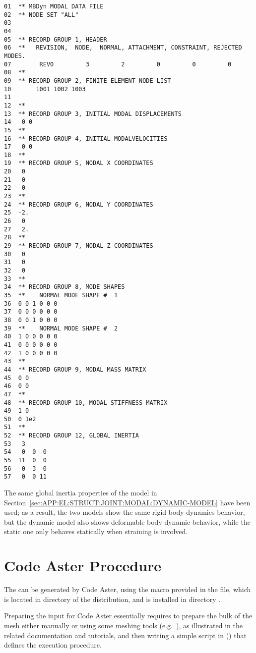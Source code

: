 \noindent
{\small
\begin{verbatim}
01  ** MBDyn MODAL DATA FILE
02  ** NODE SET "ALL" 
03    
04    
05  ** RECORD GROUP 1, HEADER
06  **   REVISION,  NODE,  NORMAL, ATTACHMENT, CONSTRAINT, REJECTED MODES.
07        REV0         3         2         0         0         0
08  **
09  ** RECORD GROUP 2, FINITE ELEMENT NODE LIST
10       1001 1002 1003
11  
12  **
13  ** RECORD GROUP 3, INITIAL MODAL DISPLACEMENTS
14   0 0
15  **
16  ** RECORD GROUP 4, INITIAL MODALVELOCITIES
17   0 0
18  **
19  ** RECORD GROUP 5, NODAL X COORDINATES
20   0
21   0
22   0
23  **
24  ** RECORD GROUP 6, NODAL Y COORDINATES
25  -2.
26   0
27   2.
28  **
29  ** RECORD GROUP 7, NODAL Z COORDINATES
30   0
31   0
32   0
33  **
34  ** RECORD GROUP 8, MODE SHAPES
35  **    NORMAL MODE SHAPE #  1
36  0 0 1 0 0 0
37  0 0 0 0 0 0
38  0 0 1 0 0 0
39  **    NORMAL MODE SHAPE #  2
40  1 0 0 0 0 0
41  0 0 0 0 0 0
42  1 0 0 0 0 0
43  **
44  ** RECORD GROUP 9, MODAL MASS MATRIX
45  0 0
46  0 0
47  **
48  ** RECORD GROUP 10, MODAL STIFFNESS MATRIX
49  1 0
50  0 1e2
51  **
52  ** RECORD GROUP 12, GLOBAL INERTIA
53   3
54   0  0  0
55  11  0  0
56   0  3  0
57   0  0 11
\end{verbatim}
}

The same global inertia properties of the model 
in Section~\ref{sec:APP:EL:STRUCT:JOINT:MODAL:DYNAMIC-MODEL} have been used;
as a result, the two models show the same rigid body dynamics behavior,
but the dynamic model also shows deformable body dynamic behavior, while
the static one only behaves statically when straining is involved.





\section{Code Aster Procedure}
\label{sec:APP:EL:STRUCT:JOINT:MODAL:ASTER}

The  can be generated by Code Aster, using
the macro provided in the  file, 
which is located in directory  
of the distribution, and is installed in directory
.

Preparing the input for Code Aster essentially requires to prepare
the bulk of the mesh either manually or using some meshing tools
(e.g.\ ), as illustrated in the related documentation
and tutorials, and then writing a simple script in 
()
that defines the execution procedure.


